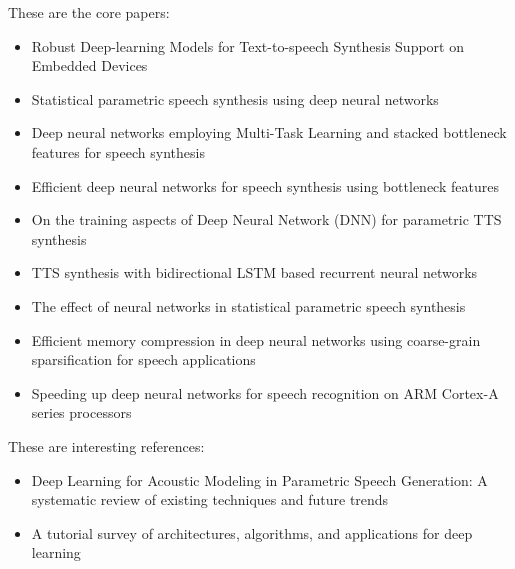 These are the core papers: 
\begin{itemize} %
	\item Robust Deep-learning Models for Text-to-speech Synthesis Support on Embedded Devices \cite{boros:robust}
	\item Statistical parametric speech synthesis using deep neural networks \cite{ze:statistical}
	\item Deep neural networks employing Multi-Task Learning and stacked bottleneck features for speech synthesis \cite{wu:deep}
	\item Efficient deep neural networks for speech synthesis using bottleneck features \cite{joo:efficient}
	\item On the training aspects of Deep Neural Network (DNN) for parametric TTS synthesis \cite{qian:training}
	\item TTS synthesis with bidirectional LSTM based recurrent neural networks \cite{fan:tts}
	\item The effect of neural networks in statistical parametric speech synthesis \cite{hashimoto:effect}
	\item Efficient memory compression in deep neural networks using coarse-grain sparsification for speech applications \cite{kadetotad:efficient}
	\item Speeding up deep neural networks for speech recognition on ARM Cortex-A series processors \cite{xing:speeding}
\end{itemize}

These are interesting references:

\begin{itemize} %
	\item Deep Learning for Acoustic Modeling in Parametric Speech Generation: A systematic review of existing techniques and future trends \cite{ling:deep}
	\item A tutorial survey of architectures, algorithms, and applications for deep learning \cite{li:survey}
\end{itemize}

\newpage